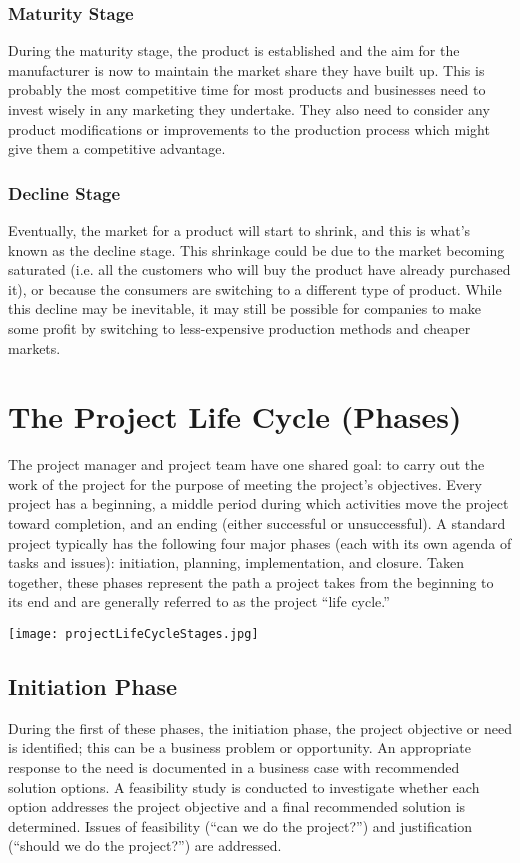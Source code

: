 \documentclass[18 pt]{article}
\begin{document}
\begin{large}
\subsubsection{Maturity Stage } During the maturity stage, the product is established and the aim for the manufacturer is now to maintain the market share they have built up. This is probably the most competitive time for most products and businesses need to invest wisely in any marketing they undertake. They also need to consider any product modifications or improvements to the production process which might give them a competitive advantage.


\subsubsection{Decline Stage } Eventually, the market for a product will start to shrink, and this is what’s known as the decline stage. This shrinkage could be due to the market becoming saturated (i.e. all the customers who will buy the product have already purchased it), or because the consumers are switching to a different type of product. While this decline may be inevitable, it may still be possible for companies to make some profit by switching to less-expensive production methods and cheaper markets.


\section{The Project Life Cycle (Phases)}

The project manager and project team have one shared goal: to carry out the work of the project for the purpose of meeting the project’s objectives. Every project has a beginning, a middle period during which activities move the project toward completion, and an ending (either successful or unsuccessful). A standard project typically has the following four major phases (each with its own agenda of tasks and issues): initiation, planning, implementation, and closure. Taken together, these phases represent the path a project takes from the beginning to its end and are generally referred to as the project “life cycle.”
\begin{center}
\texttt{[image: projectLifeCycleStages.jpg]}
\end{center}
\subsection{Initiation Phase}
During the first of these phases, the initiation phase, the project objective or need is identified; this can be a business problem or opportunity. An appropriate response to the need is documented in a business case with recommended solution options. A feasibility study is conducted to investigate whether each option addresses the project objective and a final recommended solution is determined. Issues of feasibility (“can we do the project?”) and justification (“should we do the project?”) are addressed.



\end{large}
\end{document}
